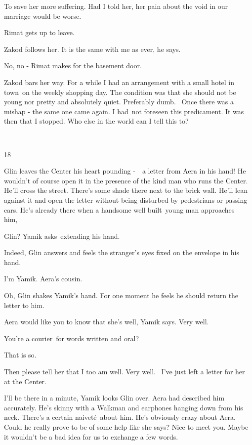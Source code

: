 \documentclass[letterpaper]{article}
\begin{document}
{\textquotedbl}To save her more suffering. Had I told her, her pain about the void in our marriage would be
worse.{\textquotedbl} 

Rimat gets up to leave.

Zakod follows her. {\textquotedbl}It is the same with me as ever,{\textquotedbl} he says. 

{\textquotedbl}No, no -{\textquotedbl} Rimat makes for the basement door. 

Zakod bars her way. {\textquotedbl}For a while I had an arrangement with a small hotel in town\ on the weekly shopping
day. The condition was that she should not be young nor pretty and absolutely quiet. Preferably dumb. ~Once there was a
mishap - the same one came again. I had\ not foreseen this predicament. It was then that I stopped. Who else in the
world can I tell this to?{\textquotedbl} 

~

18 

Glin leaves the Center his heart pounding -\ \ a letter from Aera in his hand! He wouldn't of course open it in the
presence of the kind man who runs the Center. He'll cross the street. There's some shade there next to the brick wall.
He'll lean against it and open the letter without being disturbed by pedestrians or passing cars. He's already there
when a handsome well built\ young man approaches him,~\ 

{\textquotedbl}Glin?{\textquotedbl} Yamik asks~extending his hand. 

{\textquotedbl}Indeed,{\textquotedbl} Glin answers and feels the stranger's eyes fixed on the envelope in his hand. 

{\textquotedbl}I'm Yamik. Aera's cousin.{\textquotedbl} 

{\textquotedbl}Oh,{\textquotedbl} Glin shakes Yamik's hand. For one moment he feels he should return the letter to him.
~

{\textquotedbl}Aera would like you to know that she's well,{\textquotedbl} Yamik says. {\textquotedbl}Very
well.{\textquotedbl} 

{\textquotedbl}You're a courier\ for words written and oral?{\textquotedbl} 

{\textquotedbl}That is so.{\textquotedbl} 

{\textquotedbl}Then please tell her that I too am well. Very well.~ I've just left a letter for her at the
Center.{\textquotedbl} 

{\textquotedbl}I'll be there in a minute,{\textquotedbl} Yamik looks Glin over. Aera had described him accurately. He's
skinny with a Walkman and earphones hanging down from his neck. There's a certain naivet\'e\ about him. He's obviously
crazy about Aera. Could he really prove to be of some help like she says? {\textquotedbl}Nice to meet you. Maybe it
wouldn't be a bad idea for us to exchange a few words.{\textquotedbl} 
\end{document}
